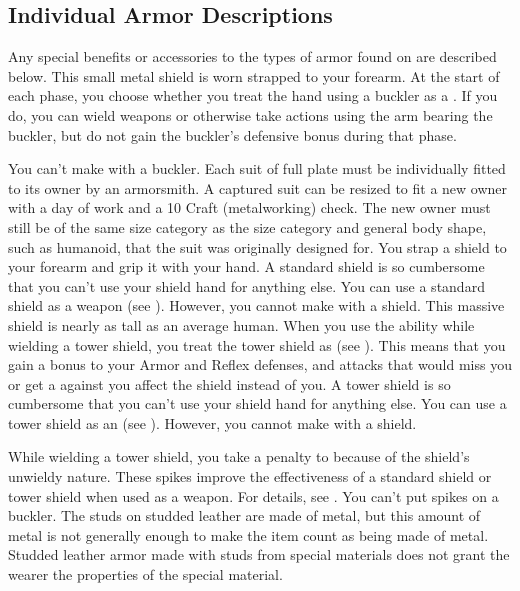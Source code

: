   \subsection{Individual Armor Descriptions}
    Any special benefits or accessories to the types of armor found on  are described below.
     This small metal shield is worn strapped to your forearm.
    At the start of each phase, you choose whether you treat the hand using a buckler as a .
    If you do, you can wield weapons or otherwise take actions using the arm bearing the buckler, but do not gain the buckler's defensive bonus during that phase.
    \par You can't make  with a buckler.
     Each suit of full plate must be individually fitted to its owner by an armorsmith.
    A captured suit can be resized to fit a new owner with a day of work and a  10 Craft (metalworking) check.
    The new owner must still be of the same size category as the size category and general body shape, such as humanoid, that the suit was originally designed for.
     You strap a shield to your forearm and grip it with your hand.
    A standard shield is so cumbersome that you can't use your shield hand for anything else.
    You can use a standard shield as a weapon (see ).
    However, you cannot make  with a shield.
     This massive shield is nearly as tall as an average human.
    When you use the  ability while wielding a tower shield, you treat the tower shield as  (see ).
    This means that you gain a  bonus to your Armor and Reflex defenses, and attacks that would miss you or get a  against you affect the shield instead of you.
    A tower shield is so cumbersome that you can't use your shield hand for anything else.
    You can use a tower shield as an  (see ).
    However, you cannot make  with a shield.

    While wielding a tower shield, you take a  penalty to  because of the shield's unwieldy nature.
     These spikes improve the effectiveness of a standard shield or tower shield when used as a weapon.
    For details, see .
    You can't put spikes on a buckler.
     The studs on studded leather are made of metal, but this amount of metal is not generally enough to make the item count as being made of metal.
    Studded leather armor made with studs from special materials does not grant the wearer the properties of the special material.

